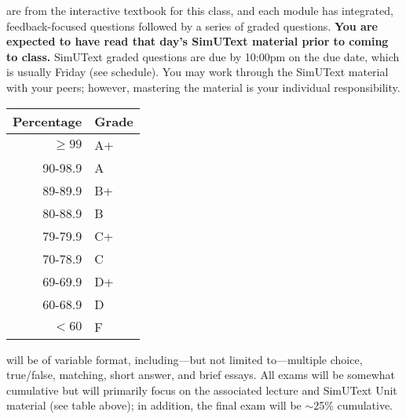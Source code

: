 \documentclass{tufte-handout}
\begin{document}
 are from the interactive textbook for this class, and each module has integrated, feedback-focused questions followed by a series of graded questions. \textbf{You are expected to have read that day's SimUText material prior to coming to class. } SimUText graded questions are due by 10:00pm on the due date, which is usually Friday (see schedule). You may work through the SimUText material with your peers; however, mastering the material is your individual responsibility.


\begin{margintable}
\begin{tabular}{rl}
Percentage & Grade \\
\hline 
$\ge99$ & A+ \\
90-98.9 & A \\
89-89.9 & B+ \\
80-88.9 & B \\
79-79.9 & C+ \\
70-78.9 & C \\
69-69.9 & D+ \\
60-68.9 & D \\
$<60$ & F \\
\hline
\end{tabular}
\end{margintable}

 will be of variable format, including---but not limited to---multiple choice, true/false, matching, short answer, and brief essays. All exams will be somewhat cumulative but will primarily focus on the associated lecture and SimUText Unit material (see table above); in addition, the final exam will be $\sim$25\% cumulative. 
\end{document}
